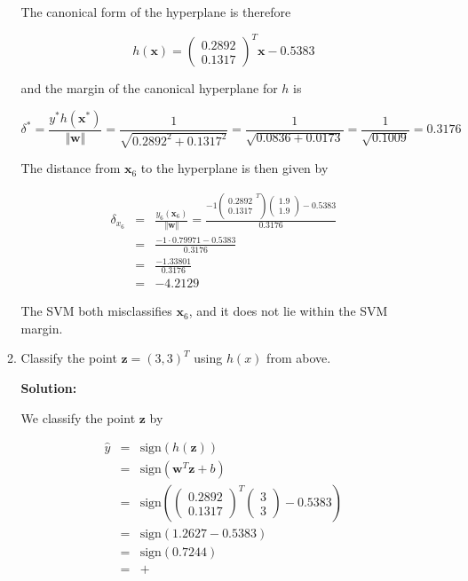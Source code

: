 \documentclass[11pt]{article}
\begin{document}
\begin{enumerate}
\begin{enumerate}
The canonical form of the hyperplane is therefore

\begin{equation*}
h(\mathbf{x}) = 
\left(
\begin{array}{c}
0.2892 \\ 0.1317
\end{array}
\right)^\mathit{T}
\mathbf{x} - 0.5383
\end{equation*}

and the margin of the canonical hyperplane for $h$ is

\begin{equation*}
\delta^*
=
\frac{y^*h(\mathbf{x}^*)}{\Vert \mathbf{w} \Vert}
=
\frac{1}{\sqrt{0.2892^2 + 0.1317^2}}
=
\frac{1}{\sqrt{0.0836 + 0.0173}}
=
\frac{1}{\sqrt{0.1009}}
=
0.3176
\end{equation*}

The distance from $\mathbf{x}_6$ to the hyperplane is then given by

\begin{eqnarray*}
\delta_{x_6}
&=&
\frac{y_6(\mathbf{x}_6)}{\Vert \mathbf{w} \Vert}
=
\frac{
-1
\left(
\begin{array}{c}
0.2892 \\ 0.1317
\end{array}^\mathit{T}
\right)
\left(
\begin{array}{c}
1.9 \\ 1.9
\end{array}
\right) - 0.5383
}{0.3176} \\
&=& \frac{-1 \cdot 0.79971 - 0.5383}{0.3176} \\
&=& \frac{-1.33801}{0.3176} \\
&=& -4.2129
\end{eqnarray*}

The SVM both misclassifies $\mathbf{x}_6$, and it does not lie within the SVM margin.

\item Classify the point $\mathbf{z} = (3, 3)^\mathit{T}$ using $h(x)$ from above.

\textbf{Solution:}

We classify the point $\mathbf{z}$ by

\begin{eqnarray*}
\hat{y} &=& \text{sign}(h(\mathbf{z})) \\
&=& \text{sign}( \mathbf{w}^\mathit{T} \mathbf{z} + b ) \\
&=& \text{sign}\left( \left( \begin{array}{c} 0.2892 \\ 0.1317 \end{array} \right)^\mathit{T} \left( \begin{array}{c} 3 \\ 3 \end{array} \right) - 0.5383 \right) \\
&=& \text{sign}(1.2627 - 0.5383) \\
&=& \text{sign}(0.7244) \\
&=& +
\end{eqnarray*}


\end{enumerate}
\end{enumerate}
\end{document}
